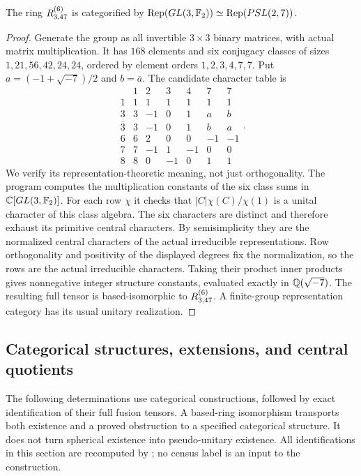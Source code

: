 \begin{proposition}\label{prop:PSLmodel}
The ring $R^{(6)}_{3,47}$ is categorified by
$\operatorname{Rep}(GL(3,\mathbb F_2))\simeq\operatorname{Rep}(PSL(2,7))$.
\end{proposition}
\begin{proof}
Generate the group as all invertible $3\times3$ binary matrices, with
actual matrix multiplication. It has $168$ elements and six conjugacy
classes of sizes $1,21,56,42,24,24$, ordered by element orders
$1,2,3,4,7,7$. Put $a=(-1+\sqrt{-7})/2$ and $b=\overline a$.
The candidate character table is
\[
\begin{array}{c|rrrrrr}
 &1&2&3&4&7&7\\\hline
1&1&1&1&1&1&1\\
3&3&-1&0&1&a&b\\
\overline3&3&-1&0&1&b&a\\
6&6&2&0&0&-1&-1\\
7&7&-1&1&-1&0&0\\
8&8&0&-1&0&1&1
\end{array}.
\]
We verify its representation-theoretic meaning, not just orthogonality.
The program computes the multiplication constants of the six class sums
in $\mathbb C[GL(3,\mathbb F_2)]$. For each row $\chi$ it checks that
$|C|\chi(C)/\chi(1)$ is a unital character of this class algebra.
The six characters are distinct and therefore exhaust its primitive
central characters. By semisimplicity they are the normalized central
characters of the actual irreducible representations. Row orthogonality
and positivity of the displayed degrees fix the normalization, so the
rows are the actual irreducible characters. Taking their product inner
products gives nonnegative integer structure constants, evaluated
exactly in $\mathbb Q(\sqrt{-7})$. The resulting full tensor is based-isomorphic
to $R^{(6)}_{3,47}$. A finite-group representation category has its usual
unitary realization.
\end{proof}

\subsection{Categorical structures, extensions, and central quotients}\label{sec:literature-models}
The following determinations use categorical constructions, followed by
exact identification of their full fusion tensors. A based-ring
isomorphism transports both existence and a proved obstruction to a
specified categorical structure. It does not turn spherical existence
into pseudo-unitary existence. All identifications in this section are
recomputed by ; no census label
is an input to the construction.

